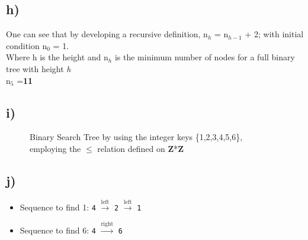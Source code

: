 \documentclass[11pt]{article}
\begin{document}
\subsection*{h)}
One can see that by developing a recursive definition, n$_h$ =  n$_{h-1}$ + 2; with initial condition n$_0$ = 1.\\
Where h is the height and n$_h$ is the minimum number of nodes for a full binary tree with height \textit{h} \\
n$_{5}$ =\textbf{11}\\
\subsection*{i)}
\begin{figure}[H]
	\centering
	\caption{Binary Search Tree by using the integer keys \{1,2,3,4,5,6\}, employing the $\leq$ relation defined on \textbf{Z}*\textbf{Z}}	
	\label{bintreeq6}
\end{figure}

\subsection*{j)}
\begin{itemize}
    \item Sequence to find 1: \texttt{4} $\xrightarrow{\text{left}}$ \texttt{2} $\xrightarrow{\text{left}}$ \texttt{1} 
    \item Sequence to find 6: \texttt{4} $\xrightarrow{\text{right}}$ \texttt{6} 
    
\end{itemize}
\end{document}
